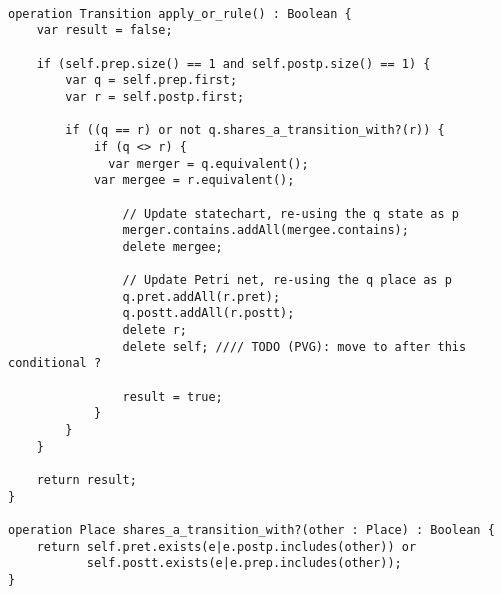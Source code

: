 
\tt
\begin{lstlisting}
operation Transition apply_or_rule() : Boolean {
	var result = false;
	
	if (self.prep.size() == 1 and self.postp.size() == 1) {
		var q = self.prep.first;
		var r = self.postp.first;
	
		if ((q == r) or not q.shares_a_transition_with?(r)) {		
			if (q <> r) {
			  var merger = q.equivalent();
  			var mergee = r.equivalent();
  			
				// Update statechart, re-using the q state as p
				merger.contains.addAll(mergee.contains);	
				delete mergee;
				
				// Update Petri net, re-using the q place as p
				q.pret.addAll(r.pret);
				q.postt.addAll(r.postt);
				delete r;
				delete self; //// TODO (PVG): move to after this conditional ?
				
				result = true;
			}
		}
	}

	return result;
}

operation Place shares_a_transition_with?(other : Place) : Boolean {
	return self.pret.exists(e|e.postp.includes(other)) or 
	       self.postt.exists(e|e.prep.includes(other));
}

\end{lstlisting}